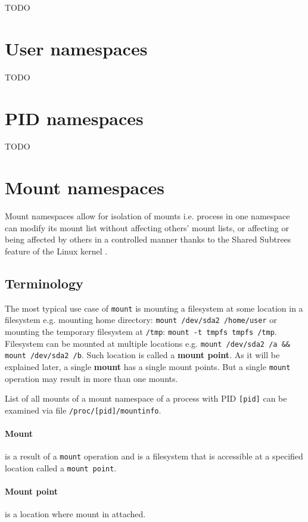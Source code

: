 \documentclass[en]{pracamgr}
\begin{document}
TODO

\section{User namespaces}
TODO

\section{PID namespaces}
TODO

\section{Mount namespaces}

Mount namespaces allow for isolation of mounts i.e. process in one namespace can modify its mount list without affecting others' mount lists, or affecting or being affected by others in a controlled manner thanks to the Shared Subtrees feature of the Linux kernel \cite{shared_subtree}.

\subsection{Terminology}

The most typical use case of \texttt{mount} is mounting a filesystem at some location in a filesystem e.g. mounting home directory: \texttt{mount /dev/sda2 /home/user} or mounting the temporary filesystem at \texttt{/tmp}: \texttt{mount -t tmpfs tmpfs /tmp}. Filesystem can be mounted at multiple locations e.g. \texttt{mount /dev/sda2 /a \&\& mount /dev/sda2 /b}. Such location is called a \textbf{mount point}. As it will be explained later, a single \textbf{mount} has a single mount points. But a single \texttt{mount} operation may result in more than one mounts.

List of all mounts of a mount namespace of a process with PID \texttt{[pid]} can be examined via file \texttt{/proc/[pid]/mountinfo}.

\paragraph{Mount} is a result of a \texttt{mount} operation and is a filesystem that is accessible at a specified location called a \texttt{mount point}.

\paragraph{Mount point} is a location where mount in attached.
\end{document}
